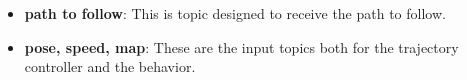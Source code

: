 \begin{itemize}
  \item \textbf{path to follow}: This is topic designed to receive the path to follow.
  \item \textbf{pose, speed, map}: These are the input topics both for the trajectory controller and the behavior.
\end{itemize}
